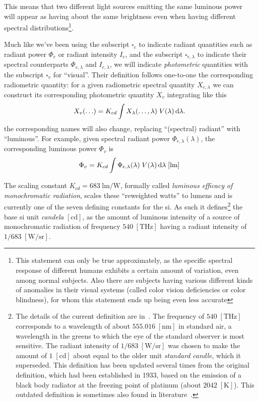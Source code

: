 This means that two different light sources emitting the same luminous
power will appear as having about the same brightness even when having
different spectral distributions\footnote{This
	statement can only be true approximately, as the specific spectral response
	of different humans exhibits a certain amount of variation, even among normal 
	subjects.
	Also there are subjects having various different kinds of anomalies in their
	visual systems (called color vision deficiencies or color blindness), 
	for whom this statement ends up being even less accurate}.

Much like we've been using the subscript $\square_e$ to indicate radiant quantities such as
radiant power $\Phi_e$ or radiant intensity $I_e$, and the subscript $\square_{e,\lambda}$ to indicate
their spectral counterparts $\Phi_{e,\lambda}$ and $I_{e,\lambda}$, we will
indicate \emph{photometric} quantities with the subscript $\square_v$ for ``visual''.
Their definition follows one-to-one the corresponding radiometric quantity: for a
given radiometric spectral quantity $X_{e,\lambda}$ we can construct its
corresponding photometric quantity $X_v$ integrating like this
\begin{equation}
	X_v(\ldots) = K_{cd} \int X_{\lambda}(\ldots,\lambda)\; V(\lambda) \mathop{}\!\mathrm{d}\lambda.
\label{eqn:rad_to_photo}
\end{equation}
the corresponding names will also change, replacing ``(spectral) radiant'' with ``luminous''.
For example, given spectral radiant power $\Phi_{e,\lambda}(\lambda)$, the
corresponding luminous power $\Phi_v$ is
\begin{displaymath}
\Phi_v = K_{cd} \int \Phi_{e,\lambda}(\lambda)\; V(\lambda) \d\lambda \;[\unit\lumen]
\end{displaymath}

The scaling constant $K_{cd} = 683\;\unit{\lumen\per\watt}$, formally called \textsl{luminous efficacy of monochromatic radiation}, 
scales these ``reweighted watts'' to lumens and is currently one of the seven defining constants 
for the \gls{si}. 
As such it defines\footnote{
	The details of the current definition are in~\cite[p. 135]{bipm:si.2019}.
	The frequency of $\num{540}\;[\unit{\tera\hertz}]$ corresponds to a wavelength of 
	about $\num{555.016}\;[\unit{\nano\meter}]$ in \gls{standard air}, a wavelength in the 
	greens to which the eye of the standard observer is most sensitive.
	The radiant intensity of $1/683\;[\unit{\watt\per\steradian}]$ was chosen to make 
	the amount of $1\;[\unit\candela]$ about equal to the older unit
	\textit{standard candle}, which it superseded. 
	This definition has been updated several times from the original definition, 
	which had been established in 1933, based on the emission of a black body radiator
	at the freezing point of platinum (about $\num{2042}\;[\unit{\kelvin}]$). 
	This outdated definition is sometimes also found in 
	literature~\cite{Meyer-Arendt:68}.
} the base \gls{si} unit \textsl{candela} $[\unit{\candela}]$, 
as the amount of luminous intensity of a source of monochromatic radiation of frequency 
$\num{540}\;[\unit{\tera\hertz}]$ having a radiant intensity of $1/683\;[\unit{\watt\per\steradian}]$.

